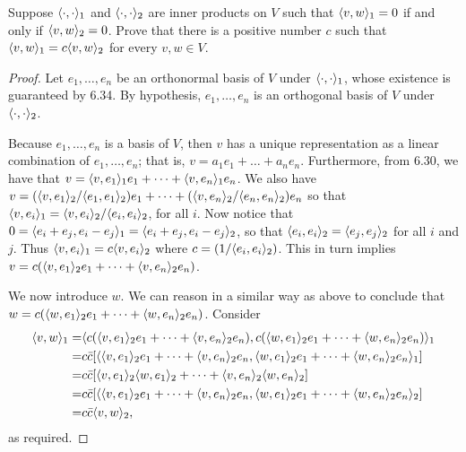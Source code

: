 \begin{exercise}{11}
  Suppose $\langle \cdot,\cdot\rangle_1$ and $\langle \cdot,\cdot\rangle_2$ are inner products on $V$ such that $\langle v,w\rangle_1=0$ if and only if $\langle v,w\rangle_2=0$. Prove that there is a positive number $c$ such that $\langle v,w\rangle_1=c\langle v,w\rangle_2$ for every $v,w\in V$.
\end{exercise}
\begin{proof}
 Let $e_1,\dots,e_n$ be an orthonormal basis of $V$ under $\langle \cdot,\cdot\rangle_1$, whose existence is guaranteed by 6.34. By hypothesis, $e_1,\dots,e_n$ is an orthogonal basis of $V$ under $\langle \cdot,\cdot\rangle_2$. 
 
 Because $e_1,\dots,e_n$ is a basis of $V$, then $v$ has a unique representation as a linear combination of $e_1,\dots,e_n$; that is, $v=a_1e_1+\dots+a_ne_n$. Furthermore, from 6.30, we have that $v=\langle v,e_1\rangle_1e_1+\dots+\langle v,e_n\rangle_1e_n$. We also have $v=(\langle v,e_1\rangle_2/\langle e_1,e_1\rangle_2)e_1+\dots+(\langle v,e_n\rangle_2/\langle e_n,e_n\rangle_2)e_n$ so that $\langle v,e_i\rangle_1=\langle v,e_i\rangle_2/\langle e_i,e_i\rangle_2$, for all $i$. Now notice that $0=\langle e_i+e_j,e_i-e_j\rangle_1=\langle e_i+e_j,e_i-e_j\rangle_2$, so that $\langle e_i,e_i\rangle_2=\langle e_j,e_j\rangle_2$ for all $i$ and $j$. Thus $\langle v,e_i\rangle_1=c\langle v,e_i\rangle_2$ where $c =(1/\langle e_i,e_i\rangle_2)$. This in turn implies $v=c(\langle v,e_1\rangle_2e_1+\dots+\langle v,e_n\rangle_2e_n)$.

 We now introduce $w$. We can reason in a similar way as above to conclude that $w=c(\langle w,e_1\rangle_2e_1+\dots+\langle w,e_n\rangle_2e_n)$. Consider
 \begin{align*}
     \langle v,w\rangle_1 =& \langle c(\langle v,e_1\rangle_2e_1+\dots+\langle v,e_n\rangle_2e_n), c(\langle w,e_1\rangle_2e_1+\dots+\langle w,e_n\rangle_2e_n)\rangle_1\\
     =& c\bar{c}[\langle \langle v,e_1\rangle_2e_1+\dots+\langle v,e_n\rangle_2e_n, \langle w,e_1\rangle_2e_1+\dots+\langle w,e_n\rangle_2e_n\rangle_1]\\
     =& c\bar{c}[\langle v,e_1\rangle_2\langle w,e_1\rangle_2+\dots+\langle v,e_n\rangle_2\langle w,e_n\rangle_2]\\
     =& c\bar{c}[\langle \langle v,e_1\rangle_2e_1+\dots+\langle v,e_n\rangle_2e_n, \langle w,e_1\rangle_2e_1+\dots+\langle w,e_n\rangle_2e_n\rangle_2]\\
     =& c\bar{c}\langle v,w\rangle_2,
 \end{align*}
 as required.
\end{proof}


